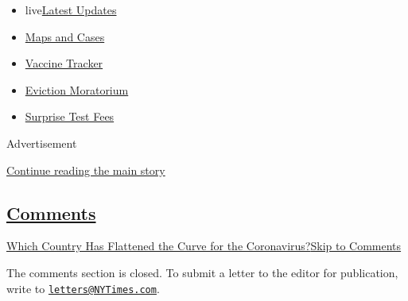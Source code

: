 \begin{itemize}
\tightlist
\item
  live\href{https://www.nytimes3xbfgragh.onion/2020/09/09/world/covid-19-coronavirus.html?name=styln-coronavirus-national\&region=TOP_BANNER\&block=storyline_menu_recirc\&action=click\&pgtype=Interactive\&impression_id=9764d221-f2b9-11ea-ac98-bf5e4fe32bbf\&variant=undefined}{Latest
  Updates}
\item
  \href{https://www.nytimes3xbfgragh.onion/interactive/2020/us/coronavirus-us-cases.html?name=styln-coronavirus-national\&region=TOP_BANNER\&block=storyline_menu_recirc\&action=click\&pgtype=Interactive\&impression_id=9764d222-f2b9-11ea-ac98-bf5e4fe32bbf\&variant=undefined}{Maps
  and Cases}
\item
  \href{https://www.nytimes3xbfgragh.onion/interactive/2020/science/coronavirus-vaccine-tracker.html?name=styln-coronavirus-national\&region=TOP_BANNER\&block=storyline_menu_recirc\&action=click\&pgtype=Interactive\&impression_id=9764d223-f2b9-11ea-ac98-bf5e4fe32bbf\&variant=undefined}{Vaccine
  Tracker}
\item
  \href{https://www.nytimes3xbfgragh.onion/2020/09/02/your-money/eviction-moratorium-covid.html?name=styln-coronavirus-national\&region=TOP_BANNER\&block=storyline_menu_recirc\&action=click\&pgtype=Interactive\&impression_id=9764f930-f2b9-11ea-ac98-bf5e4fe32bbf\&variant=undefined}{Eviction
  Moratorium}
\item
  \href{https://www.nytimes3xbfgragh.onion/2020/09/09/upshot/coronavirus-surprise-test-fees.html?name=styln-coronavirus-national\&region=TOP_BANNER\&block=storyline_menu_recirc\&action=click\&pgtype=Interactive\&impression_id=9764f931-f2b9-11ea-ac98-bf5e4fe32bbf\&variant=undefined}{Surprise
  Test Fees}
\end{itemize}

Advertisement

\protect\hyperlink{after-top}{Continue reading the main story}

\hypertarget{comments}{%
\subsection{\texorpdfstring{\protect\hyperlink{commentsContainer}{Comments}}{Comments}}\label{comments}}

\href{}{Which Country Has Flattened the Curve for the
Coronavirus?}\href{}{Skip to Comments}

The comments section is closed. To submit a letter to the editor for
publication, write to
\href{mailto:letters@NYTimes.com}{\nolinkurl{letters@NYTimes.com}}.

